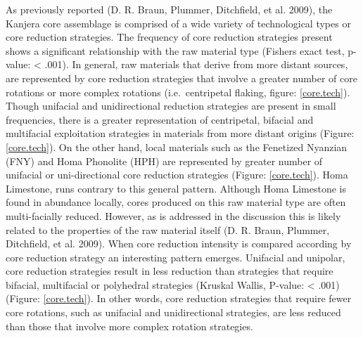\documentclass[]{elsarticle} %
\begin{document}
As previously reported (D. R. Braun, Plummer, Ditchfield, et al. 2009),
the Kanjera core assemblage is comprised of a wide variety of
technological types or core reduction strategies. The frequency of core
reduction strategies present shows a significant relationship with the
raw material type (Fishers exact test, p-value: \textless{} .001). In
general, raw materials that derive from more distant sources, are
represented by core reduction strategies that involve a greater number
of core rotations or more complex rotations (i.e.~centripetal flaking,
figure: \ref{core.tech}). Though unifacial and unidirectional reduction
strategies are present in small frequencies, there is a greater
representation of centripetal, bifacial and multifacial exploitation
strategies in materials from more distant origins (Figure:
\ref{core.tech}). On the other hand, local materials such as the
Fenetized Nyanzian (FNY) and Homa Phonolite (HPH) are represented by
greater number of unifacial or uni-directional core reduction strategies
(Figure: \ref{core.tech}). Homa Limestone, runs contrary to this general
pattern. Although Homa Limestone is found in abundance locally, cores
produced on this raw material type are often multi-facially reduced.
However, as is addressed in the discussion this is likely related to the
properties of the raw material itself (D. R. Braun, Plummer, Ditchfield,
et al. 2009). When core reduction intensity is compared according by
core reduction strategy an interesting pattern emerges. Unifacial and
unipolar, core reduction strategies result in less reduction than
strategies that require bifacial, multifacial or polyhedral strategies
(Kruskal Wallis, P-value: \textless{} .001) (Figure: \ref{core.tech}).
In other words, core reduction strategies that require fewer core
rotations, such as unifacial and unidirectional strategies, are less
reduced than those that involve more complex rotation strategies.
\end{document}
